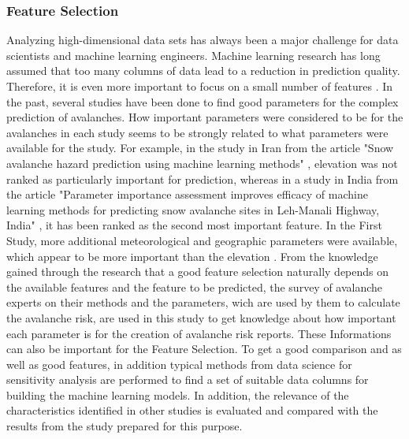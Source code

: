 \documentclass[12pt,a4paper]{article}
\begin{document}
\subsubsection{Feature Selection}
Analyzing high-dimensional data sets has always been a major challenge for data scientists and machine learning engineers. Machine learning research has long assumed that too many columns of data lead to a reduction in prediction quality. Therefore, it is even more important to focus on a small number of features \autocites{CAI201870}. 
In the past, several studies have been done to find good parameters for the complex prediction of avalanches. 
How important parameters were considered to be for the avalanches in each study seems to be strongly related to what parameters were available for the study. 
For example, in the study in Iran from the article "Snow avalanche hazard prediction using machine learning methods" \autocite{Bahram:2019}, elevation was not ranked as particularly important for prediction, whereas in a study in India from the article "Parameter importance assessment improves efficacy of machine learning methods for predicting snow avalanche sites in Leh-Manali Highway, India" \autocite[]{Tiwari:2021}, it has been ranked as the second most important feature. 
In the First Study, more additional meteorological and geographic parameters were available, which appear to be more important than the elevation \autocite{Bahram:2019} \autocite[]{Tiwari:2021}. 
From the knowledge gained through the research that a good feature selection naturally depends on the available features and the feature to be predicted, the survey of avalanche experts on their methods and the parameters, wich are used by them to calculate the avalanche risk, are used in this study to get knowledge about how important each parameter is for the creation of avalanche risk reports. These Informations can also be important for the Feature Selection.
To get a good comparison and as well as good features, in addition typical methods from data science for sensitivity analysis are performed to find a set of suitable data columns for building the machine learning models. 
In addition, the relevance of the characteristics identified in other studies is evaluated and compared with the results from the study prepared for this purpose.
\end{document}
